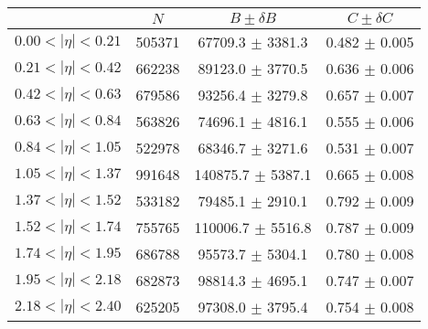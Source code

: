 \begin{tabular}{lccc}
\hline
    &   $N$   & $B \pm \delta B$  &  $C \pm \delta C$ \\
\hline
$0.00 < |\eta| <0.21$          & 505371     & 67709.3    $\pm$ 3381.3 & 0.482      $\pm$ 0.005 \\
$0.21 < |\eta| <0.42$          & 662238     & 89123.0    $\pm$ 3770.5 & 0.636      $\pm$ 0.006 \\
$0.42 < |\eta| <0.63$          & 679586     & 93256.4    $\pm$ 3279.8 & 0.657      $\pm$ 0.007 \\
$0.63 < |\eta| <0.84$          & 563826     & 74696.1    $\pm$ 4816.1 & 0.555      $\pm$ 0.006 \\
$0.84 < |\eta| <1.05$          & 522978     & 68346.7    $\pm$ 3271.6 & 0.531      $\pm$ 0.007 \\
$1.05 < |\eta| <1.37$          & 991648     & 140875.7   $\pm$ 5387.1 & 0.665      $\pm$ 0.008 \\
$1.37 < |\eta| <1.52$          & 533182     & 79485.1    $\pm$ 2910.1 & 0.792      $\pm$ 0.009 \\
$1.52 < |\eta| <1.74$          & 755765     & 110006.7   $\pm$ 5516.8 & 0.787      $\pm$ 0.009 \\
$1.74 < |\eta| <1.95$          & 686788     & 95573.7    $\pm$ 5304.1 & 0.780      $\pm$ 0.008 \\
$1.95 < |\eta| <2.18$          & 682873     & 98814.3    $\pm$ 4695.1 & 0.747      $\pm$ 0.007 \\
$2.18 < |\eta| <2.40$          & 625205     & 97308.0    $\pm$ 3795.4 & 0.754      $\pm$ 0.008 \\
\hline
\end{tabular}
